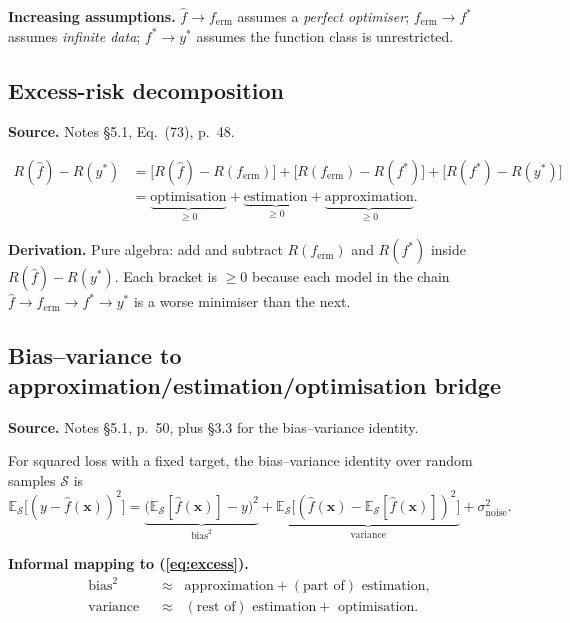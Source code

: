 \documentclass[11pt,a4paper]{article}
\newcommand{\E}{\mathbb{E}}
\newcommand{\Sset}{\mathcal{S}}
\theoremstyle{definition}
\begin{document}
\noindent\textbf{Increasing assumptions.} $\hat f \to f_{\mathrm{erm}}$ assumes a \emph{perfect optimiser}; $f_{\mathrm{erm}}\to f^{*}$ assumes \emph{infinite data}; $f^{*}\to y^{*}$ assumes the function class is unrestricted.

\subsection{Excess-risk decomposition}

\noindent\textbf{Source.} Notes \S5.1, Eq.~(73), p.~48.

\begin{align}
R(\hat f) - R(y^{*}) &= \bigl[R(\hat f) - R(f_{\mathrm{erm}})\bigr] + \bigl[R(f_{\mathrm{erm}}) - R(f^{*})\bigr] + \bigl[R(f^{*}) - R(y^{*})\bigr]\nonumber\\
&= \underbrace{\text{optimisation}}_{\ge 0} + \underbrace{\text{estimation}}_{\ge 0} + \underbrace{\text{approximation}}_{\ge 0}. \label{eq:excess}
\end{align}

\noindent\textbf{Derivation.} Pure algebra: add and subtract $R(f_{\mathrm{erm}})$ and $R(f^{*})$ inside $R(\hat f) - R(y^{*})$. Each bracket is $\ge 0$ because each model in the chain $\hat f \to f_{\mathrm{erm}} \to f^{*} \to y^{*}$ is a worse minimiser than the next.

\subsection{Bias--variance to approximation/estimation/optimisation bridge}

\noindent\textbf{Source.} Notes \S5.1, p.~50, plus \S3.3 for the bias--variance identity.

For squared loss with a fixed target, the bias--variance identity over random samples $\Sset$ is
\[
\E_{\Sset}\bigl[(y - \hat f(\bm{x}))^{2}\bigr] = \underbrace{\bigl(\E_{\Sset}[\hat f(\bm{x})] - y\bigr)^{2}}_{\text{bias}^2} + \underbrace{\E_{\Sset}\bigl[(\hat f(\bm{x}) - \E_{\Sset}[\hat f(\bm{x})])^{2}\bigr]}_{\text{variance}} + \sigma^{2}_{\text{noise}}.
\]

\noindent\textbf{Informal mapping to (\ref{eq:excess}).}
\begin{align*}
\text{bias}^{2}\;\;&\approx\;\;\text{approximation} + (\text{part of}) \text{ estimation},\\
\text{variance}\;\;&\approx\;\;(\text{rest of}) \text{ estimation} + \text{ optimisation}.
\end{align*}
\end{document}
